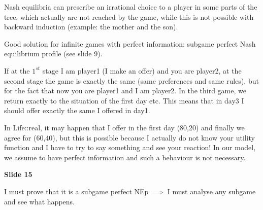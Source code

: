 \noindent Nash equilibria can prescribe an irrational choice to a player in 
some parts of the tree, which actually are not reached by the game, while 
this is not possible with backward induction (example: the mother and the son).

\noindent Good solution for infinite games with perfect information: subgame 
perfect Nash equilibrium profile (see slide 9).

\noindent If at the $1^{st}$ stage I am player1 (I make an offer) and you are 
player2, at the second stage the game is exactly the same (same preferences 
and same rules), but for the fact that now you are player1 and I am player2. In 
the third game, we return exactly to the situation of the first day etc. This 
means that in day3 I should offer exactly the same I offered in day1.

\noindent In Life::real, it may happen that I offer in the first day (80,20) and 
finally we agree for (60,40), but this is possible because I actually do not 
know your utility function and I have to try to say something and see your 
reaction! In our model, we assume to have perfect information and such a 
behaviour is not necessary.

\bigskip
\noindent \textbf{Slide 15}

\noindent I must prove that it is a subgame perfect NEp $\implies$ I must 
analyse any subgame and see what happens.

%
